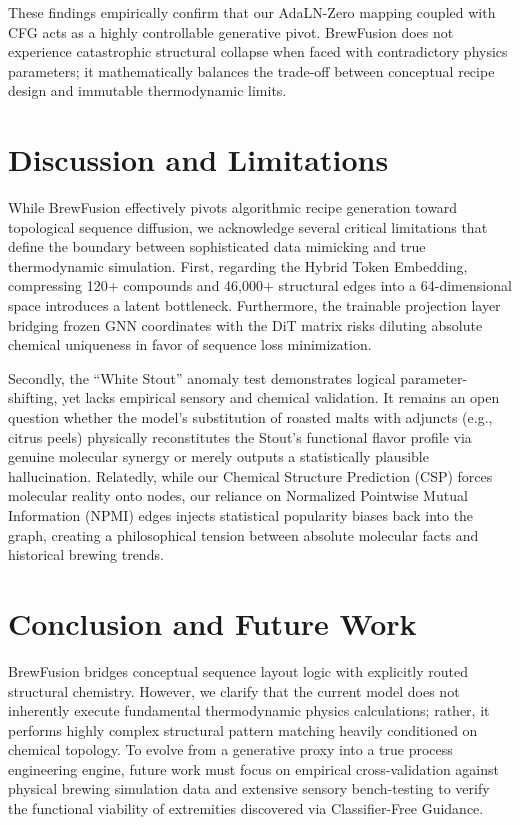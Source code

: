 \documentclass[10pt,twocolumn,letterpaper]{article}
\begin{document}
These findings empirically confirm that our AdaLN-Zero mapping coupled with CFG acts as a highly controllable generative pivot. BrewFusion does not experience catastrophic structural collapse when faced with contradictory physics parameters; it mathematically balances the trade-off between conceptual recipe design and immutable thermodynamic limits.

\section{Discussion and Limitations}
While BrewFusion effectively pivots algorithmic recipe generation toward topological sequence diffusion, we acknowledge several critical limitations that define the boundary between sophisticated data mimicking and true thermodynamic simulation. First, regarding the Hybrid Token Embedding, compressing 120+ compounds and 46,000+ structural edges into a 64-dimensional space introduces a latent bottleneck. Furthermore, the trainable projection layer bridging frozen GNN coordinates with the DiT matrix risks diluting absolute chemical uniqueness in favor of sequence loss minimization. 

Secondly, the ``White Stout'' anomaly test demonstrates logical parameter-shifting, yet lacks empirical sensory and chemical validation. It remains an open question whether the model's substitution of roasted malts with adjuncts (e.g., citrus peels) physically reconstitutes the Stout's functional flavor profile via genuine molecular synergy or merely outputs a statistically plausible hallucination. Relatedly, while our Chemical Structure Prediction (CSP) forces molecular reality onto nodes, our reliance on Normalized Pointwise Mutual Information (NPMI) edges injects statistical popularity biases back into the graph, creating a philosophical tension between absolute molecular facts and historical brewing trends.

\section{Conclusion and Future Work}
BrewFusion bridges conceptual sequence layout logic with explicitly routed structural chemistry. However, we clarify that the current model does not inherently execute fundamental thermodynamic physics calculations; rather, it performs highly complex structural pattern matching heavily conditioned on chemical topology. To evolve from a generative proxy into a true process engineering engine, future work must focus on empirical cross-validation against physical brewing simulation data and extensive sensory bench-testing to verify the functional viability of extremities discovered via Classifier-Free Guidance.
\end{document}
